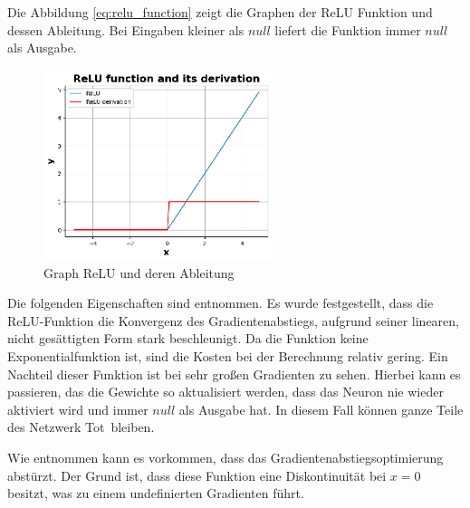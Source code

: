 
Die Abbildung \ref{eq:relu_function} zeigt die Graphen der ReLU Funktion und dessen Ableitung. Bei Eingaben kleiner als $null$ liefert die Funktion immer $null$ als Ausgabe.

\begin{figure}[!ht]
	\includegraphics[width=0.6\textwidth]{content/chapter_basics/plots/relu_func_plot.eps}
	\centering
	\caption{Graph ReLU und deren Ableitung}
	\label{img:relu_func_graph}
\end{figure}

Die folgenden Eigenschaften sind \cite{cs231n_2024} entnommen. Es wurde festgestellt, dass die ReLU-Funktion die Konvergenz des Gradientenabstiegs, aufgrund seiner linearen, nicht gesättigten Form stark beschleunigt. Da die Funktion keine Exponentialfunktion ist, sind die Kosten bei der Berechnung relativ gering. Ein Nachteil dieser Funktion ist bei sehr großen Gradienten zu sehen. Hierbei kann es passieren, das die Gewichte so aktualisiert werden, dass das Neuron nie wieder aktiviert wird und immer $null$ als Ausgabe hat. In diesem Fall können ganze Teile des Netzwerk \glqq Tot\grqq \ bleiben. 
\vspace{0.2cm}

Wie \cite{yuen_universal_2021} entnommen kann es vorkommen, dass das Gradientenabstiegsoptimierung abstürzt. Der Grund ist, dass diese Funktion eine Diskontinuität bei $x=0$ besitzt, was zu einem undefinierten Gradienten führt.\vspace{0.2cm} 

